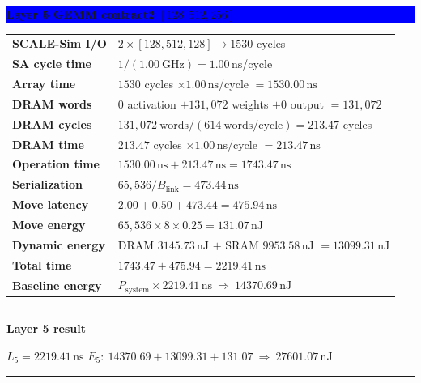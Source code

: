 \documentclass[10pt]{article}
\newcommand{\ns}{\,\mathrm{ns}}
\newcommand{\nj}{\,\mathrm{nJ}}
\newenvironment{resultbox}[1]
  {\begin{center}\begin{minipage}{0.93\linewidth}\color{green}
   \hrule height 1pt\vspace{0.35em}\textbf{#1}\par\smallskip\color{black}}
  {\vspace{0.25em}\color{green}\hrule height 1pt\end{minipage}\end{center}}
\newcommand{\layerbar}[1]{\vspace{0.35em}\noindent
  \colorbox{blue}{\parbox{\dimexpr\linewidth-2\fboxsep\relax}{
  \color{white}\bfseries #1}}\par\vspace{0.2em}}
\begin{document}
\newpage
\layerbar{Layer 5 \quad GEMM contract2 \quad $[128,512,256]$}
\begin{tabularx}{\linewidth}{@{}L Y@{}}
\textbf{SCALE-Sim I/O} & $2\times[128,512,128]\rightarrow1530$ cycles \\
\textbf{SA cycle time} & $1/(1.00\ \mathrm{GHz})=1.00\ns$/cycle \\
\textbf{Array time} & $1530$ cycles $\times1.00\ns$/cycle $=1530.00\ns$ \\
\textbf{DRAM words} & $0$ activation $+131{,}072$ weights $+0$ output $=131{,}072$ \\
\textbf{DRAM cycles} & $131{,}072\ \mathrm{words}/(614\ \mathrm{words/cycle})=213.47$ cycles \\
\textbf{DRAM time} & $213.47$ cycles $\times1.00\ns$/cycle $=213.47\ns$ \\
\textbf{Operation time} & $1530.00\ns+213.47\ns=1743.47\ns$ \\
\textbf{Serialization} & $65{,}536/B_{\mathrm{link}}=473.44\ns$ \\
\textbf{Move latency} & $2.00+0.50+473.44=475.94\ns$ \\
\textbf{Move energy} & $65{,}536\times8\times0.25=131.07\nj$ \\
\textbf{Dynamic energy} & DRAM $3145.73\nj$ $+$ SRAM $9953.58\nj$ $=13099.31\nj$ \\
\textbf{Total time} & $1743.47+475.94=2219.41\ns$ \\
\textbf{Baseline energy} & $P_{\mathrm{system}}\times2219.41\ns\ \Longrightarrow\ 14370.69\nj$ \\
\bottomrule
\end{tabularx}
\begin{resultbox}{Layer 5 result}
$L_5=2219.41\ns$ \hfill $E_5:\ 14370.69+13099.31+131.07\ \Longrightarrow\ 27601.07\nj$
\end{resultbox}
\end{document}
